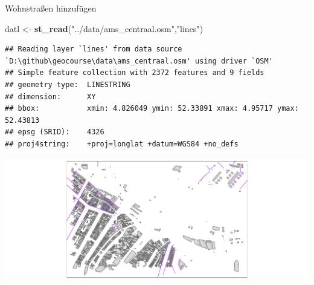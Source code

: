 \documentclass[ignorenonframetext,]{beamer}
\newenvironment{Shaded}{\begin{snugshade}}{\end{snugshade}}
\newcommand{\DataTypeTok}[1]{\textcolor[rgb]{0.13,0.29,0.53}{#1}}
\newcommand{\KeywordTok}[1]{\textcolor[rgb]{0.13,0.29,0.53}{\textbf{#1}}}
\newcommand{\NormalTok}[1]{#1}
\newcommand{\OperatorTok}[1]{\textcolor[rgb]{0.81,0.36,0.00}{\textbf{#1}}}
\newcommand{\StringTok}[1]{\textcolor[rgb]{0.31,0.60,0.02}{#1}}
\begin{document}
\begin{frame}[fragile]{Wohnstraßen hinzufügen}
\protect\hypertarget{wohnstraen-hinzufugen}{}

\begin{Shaded}
\begin{Highlighting}[]
\NormalTok{datl <-}\StringTok{ }\KeywordTok{st_read}\NormalTok{(}\StringTok{"../data/ams_centraal.osm"}\NormalTok{,}\StringTok{"lines"}\NormalTok{)}
\end{Highlighting}
\end{Shaded}

\begin{verbatim}
## Reading layer `lines' from data source `D:\github\geocourse\data\ams_centraal.osm' using driver `OSM'
## Simple feature collection with 2372 features and 9 fields
## geometry type:  LINESTRING
## dimension:      XY
## bbox:           xmin: 4.826049 ymin: 52.33891 xmax: 4.95717 ymax: 52.43813
## epsg (SRID):    4326
## proj4string:    +proj=longlat +datum=WGS84 +no_defs
\end{verbatim}

\begin{Shaded}
\end{Shaded}

\includegraphics{B7_simplefeatures_files/figure-beamer/unnamed-chunk-30-1.pdf}

\end{frame}
\end{document}
